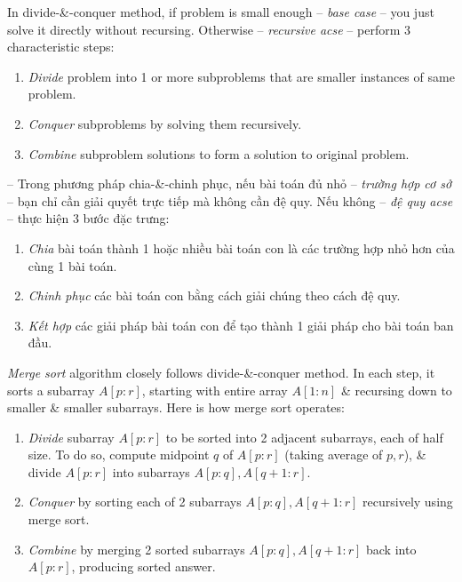 \documentclass{article}
\begin{document}
\begin{itemize}
\begin{itemize}
\begin{itemize}
\begin{itemize}
                In divide-\&-conquer method, if problem is small enough -- {\it base case} -- you just solve it directly without recursing. Otherwise -- {\it recursive acse} -- perform 3 characteristic steps:
                \begin{enumerate}
                    \item {\it Divide} problem into 1 or more subproblems that are smaller instances of same problem.
                    \item {\it Conquer} subproblems by solving them recursively.
                    \item {\it Combine} subproblem solutions to form a solution to original problem.
                \end{enumerate}
                -- Trong phương pháp chia-\&-chinh phục, nếu bài toán đủ nhỏ -- {\it trường hợp cơ sở} -- bạn chỉ cần giải quyết trực tiếp mà không cần đệ quy. Nếu không -- {\it đệ quy acse} -- thực hiện 3 bước đặc trưng:
                \begin{enumerate}
                    \item {\it Chia} bài toán thành 1 hoặc nhiều bài toán con là các trường hợp nhỏ hơn của cùng 1 bài toán.
                    \item {\it Chinh phục} các bài toán con bằng cách giải chúng theo cách đệ quy.
                    \item {\it Kết hợp} các giải pháp bài toán con để tạo thành 1 giải pháp cho bài toán ban đầu.
                \end{enumerate}                
                {\it Merge sort} algorithm closely follows divide-\&-conquer method. In each step, it sorts a subarray $A[p:r]$, starting with entire array $A[1:n]$ \& recursing down to smaller \& smaller subarrays. Here is how merge sort operates:
                \begin{enumerate}
                    \item {\it Divide} subarray $A[p:r]$ to be sorted into 2 adjacent subarrays, each of half size. To do so, compute midpoint $q$ of $A[p:r]$ (taking average of $p,r$), \& divide $A[p:r]$ into subarrays $A[p:q],A[q + 1:r]$.
                    \item {\it Conquer} by sorting each of 2 subarrays $A[p:q],A[q + 1:r]$ recursively using merge sort.
                    \item {\it Combine} by merging 2 sorted subarrays $A[p:q],A[q + 1:r]$ back into $A[p:r]$, producing sorted answer.
                \end{enumerate}

\end{itemize}
\end{itemize}
\end{itemize}
\end{itemize}
\end{document}
